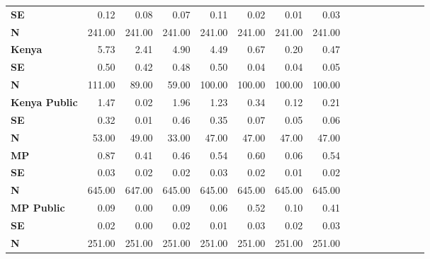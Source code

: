 \begin{tabular}{@{\extracolsep{5pt}}lrrrrrrrrrrrrrrr}
{\bf SE} & 0.12\phantom{***} & 0.08\phantom{***} & 0.07\phantom{***} & 0.11\phantom{***} & 0.02\phantom{***} & 0.01\phantom{***} & 0.03\phantom{***} \\
{\bf N} & 241.00\phantom{***} & 241.00\phantom{***} & 241.00\phantom{***} & 241.00\phantom{***} & 241.00\phantom{***} & 241.00\phantom{***} & 241.00\phantom{***} \\
{\bf Kenya} & 5.73\phantom{***} & 2.41\phantom{***} & 4.90\phantom{***} & 4.49\phantom{***} & 0.67\phantom{***} & 0.20\phantom{***} & 0.47\phantom{***} \\
{\bf SE} & 0.50\phantom{***} & 0.42\phantom{***} & 0.48\phantom{***} & 0.50\phantom{***} & 0.04\phantom{***} & 0.04\phantom{***} & 0.05\phantom{***} \\
{\bf N} & 111.00\phantom{***} & 89.00\phantom{***} & 59.00\phantom{***} & 100.00\phantom{***} & 100.00\phantom{***} & 100.00\phantom{***} & 100.00\phantom{***} \\
{\bf Kenya Public} & 1.47\phantom{***} & 0.02\phantom{***} & 1.96\phantom{***} & 1.23\phantom{***} & 0.34\phantom{***} & 0.12\phantom{***} & 0.21\phantom{***} \\
{\bf SE} & 0.32\phantom{***} & 0.01\phantom{***} & 0.46\phantom{***} & 0.35\phantom{***} & 0.07\phantom{***} & 0.05\phantom{***} & 0.06\phantom{***} \\
{\bf N} & 53.00\phantom{***} & 49.00\phantom{***} & 33.00\phantom{***} & 47.00\phantom{***} & 47.00\phantom{***} & 47.00\phantom{***} & 47.00\phantom{***} \\
{\bf MP} & 0.87\phantom{***} & 0.41\phantom{***} & 0.46\phantom{***} & 0.54\phantom{***} & 0.60\phantom{***} & 0.06\phantom{***} & 0.54\phantom{***} \\
{\bf SE} & 0.03\phantom{***} & 0.02\phantom{***} & 0.02\phantom{***} & 0.03\phantom{***} & 0.02\phantom{***} & 0.01\phantom{***} & 0.02\phantom{***} \\
{\bf N} & 645.00\phantom{***} & 647.00\phantom{***} & 645.00\phantom{***} & 645.00\phantom{***} & 645.00\phantom{***} & 645.00\phantom{***} & 645.00\phantom{***} \\
{\bf MP Public} & 0.09\phantom{***} & 0.00\phantom{***} & 0.09\phantom{***} & 0.06\phantom{***} & 0.52\phantom{***} & 0.10\phantom{***} & 0.41\phantom{***} \\
{\bf SE} & 0.02\phantom{***} & 0.00\phantom{***} & 0.02\phantom{***} & 0.01\phantom{***} & 0.03\phantom{***} & 0.02\phantom{***} & 0.03\phantom{***} \\
{\bf N} & 251.00\phantom{***} & 251.00\phantom{***} & 251.00\phantom{***} & 251.00\phantom{***} & 251.00\phantom{***} & 251.00\phantom{***} & 251.00\phantom{***} \\

\end{tabular}
